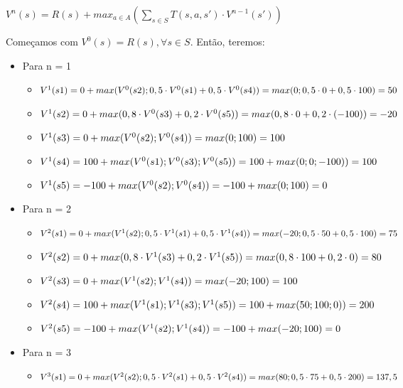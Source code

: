 \documentclass[12pt,letterpaper]{article}
\begin{document}
	\begin{center}
		$V^n(s) = R(s) + max_{a \in A}({\sum_{s \in S}T(s, a, s')\cdot V^{n-1}(s')})$
	\end{center}
	
	Começamos com $V^0(s) = R(s), \forall s \in S$. Então, teremos:
	
	\begin{itemize}
		\item Para n = 1
		\begin{itemize}
			\item $V^1(s1) = 0 + max(V^0(s2);0,5\cdot V^0(s1) + 0,5\cdot V^0(s4)) \\= max(0;0,5\cdot 0 + 0,5\cdot 100) = 50$
			\item $V^1(s2) = 0 + max(0,8\cdot V^0(s3) + 0,2\cdot V^0(s5)) \\= max(0,8\cdot 0 + 0,2\cdot (-100)) = -20$
			\item $V^1(s3) = 0 + max(V^0(s2);V^0(s4)) \\= max(0; 100) = 100$
			\item $V^1(s4) = 100 + max(V^0(s1);V^0(s3);V^0(s5)) \\= 100 + max(0;0;-100)) = 100$
			\item $V^1(s5) = -100 + max(V^0(s2);V^0(s4)) \\= -100 + max(0;100) = 0$
		\end{itemize}
		\item Para n = 2
		\begin{itemize}
			\item $V^2(s1) = 0 + max(V^1(s2);0,5\cdot V^1(s1) + 0,5\cdot V^1(s4)) \\= max(-20;0,5\cdot 50 + 0,5\cdot 100) = 75$
			\item $V^2(s2) = 0 + max(0,8\cdot V^1(s3) + 0,2\cdot V^1(s5)) \\= max(0,8\cdot 100 + 0,2\cdot 0) = 80$
			\item $V^2(s3) = 0 + max(V^1(s2);V^1(s4)) \\= max(-20; 100) = 100$
			\item $V^2(s4) = 100 + max(V^1(s1);V^1(s3);V^1(s5)) \\= 100 + max(50;100;0)) = 200$
			\item $V^2(s5) = -100 + max(V^1(s2);V^1(s4)) \\= -100 + max(-20;100) = 0$
		\end{itemize}
		\item Para n = 3
		\begin{itemize}
			\item $V^3(s1) = 0 + max(V^2(s2);0,5\cdot V^2(s1) + 0,5\cdot V^2(s4)) \\= max(80;0,5\cdot 75 + 0,5\cdot 200) = 137,5$

\end{itemize}
\end{itemize}
\end{document}
